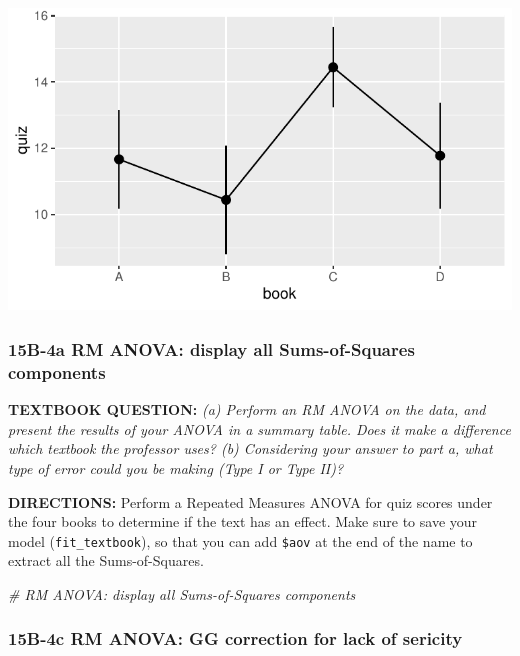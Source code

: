 \documentclass[
]{article}
\newenvironment{Shaded}{\begin{snugshade}}{\end{snugshade}}
\newcommand{\CommentTok}[1]{\textcolor[rgb]{0.56,0.35,0.01}{\textit{#1}}}
\begin{document}
\begin{center}\includegraphics{Chapter-15-Assignment-R-Skeleton--2020spring_files/figure-latex/unnamed-chunk-22-1} \end{center}

\clearpage

\hypertarget{b-4a-rm-anova-display-all-sums-of-squares-components}{%
\subsubsection{15B-4a RM ANOVA: display all Sums-of-Squares
components}\label{b-4a-rm-anova-display-all-sums-of-squares-components}}

\textbf{TEXTBOOK QUESTION:} \emph{(a) Perform an RM ANOVA on the data,
and present the results of your ANOVA in a summary table. Does it make a
difference which textbook the professor uses? (b) Considering your
answer to part a, what type of error could you be making (Type I or Type
II)?}

\textbf{DIRECTIONS:} Perform a Repeated Measures ANOVA for quiz scores
under the four books to determine if the text has an effect. Make sure
to save your model (\texttt{fit\_textbook}), so that you can add
\texttt{\$aov} at the end of the name to extract all the
Sums-of-Squares.

\begin{Shaded}
\begin{Highlighting}[]
\CommentTok{# RM ANOVA: display all Sums-of-Squares components}
\end{Highlighting}
\end{Shaded}

\clearpage

\hypertarget{b-4c-rm-anova-gg-correction-for-lack-of-sericity}{%
\subsubsection{15B-4c RM ANOVA: GG correction for lack of
sericity}\label{b-4c-rm-anova-gg-correction-for-lack-of-sericity}}
\end{document}
